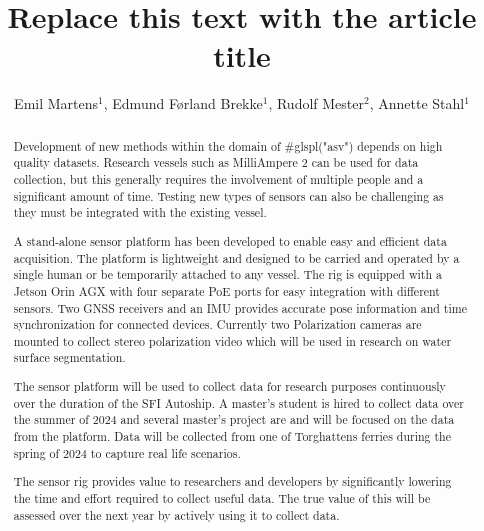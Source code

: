 \documentclass{iopconfser}
\begin{document}
\title{Replace this text with the article title}

\author{Emil Martens$^{1}$, Edmund Førland Brekke$^{1}$, Rudolf Mester$^{2}$, Annette Stahl$^{1}$}



\begin{abstract}

    Development of new methods within the domain of #glspl("asv") depends on high quality datasets. 
    Research vessels such as MilliAmpere 2 can be used for data collection, but this generally requires the involvement of multiple people and a significant amount of time. 
    Testing new types of sensors can also be challenging as they must be integrated with the existing vessel.
    
    A stand-alone sensor platform has been developed to enable easy and efficient data acquisition. 
    The platform is lightweight and designed to be carried and operated by a single human or be temporarily attached to any vessel. 
    The rig is equipped with a Jetson Orin AGX with four separate PoE ports for easy integration with different sensors. 
    Two GNSS receivers and an IMU provides accurate pose information and time synchronization for connected devices. 
    Currently two Polarization cameras are mounted to collect stereo polarization video which will be used in research on water surface segmentation.
    
    
    The sensor platform will be used to collect data for research purposes continuously over the duration of the SFI Autoship. 
    A master's student is hired to collect data over the summer of 2024 and several master's project are and will be focused on the data from the platform. 
    Data will be collected from one of Torghattens ferries during the spring of 2024 to capture real life scenarios.
    
    
    The sensor rig provides value to researchers and developers by significantly lowering the time and effort required to collect useful data. 
    The true value of this will be assessed over the next year by actively using it to collect data.
    
\end{abstract}



\end{document}
